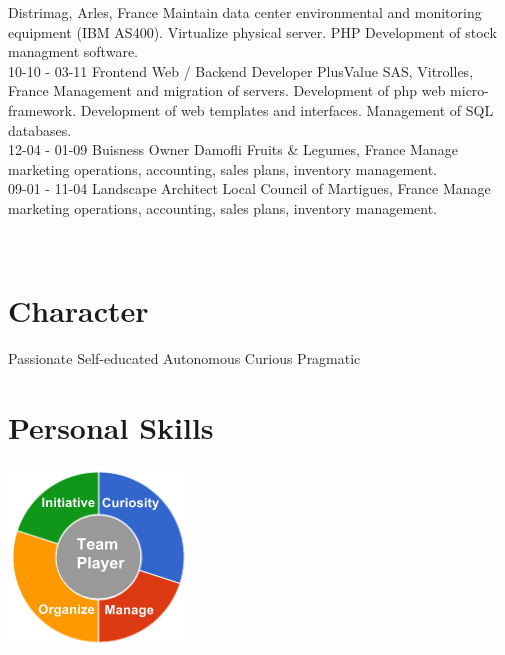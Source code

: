 \documentclass[]{friggeri-cv}
\begin{document}
\begin{entrylist}
        {Distrimag, Arles, France}
        {Maintain data center environmental and monitoring equipment (IBM AS400). Virtualize physical server. PHP Development of stock managment software.\\}
    \entry
        {10-10 - 03-11}
        {Frontend Web / Backend Developer}
        {PlusValue SAS, Vitrolles, France}
        {Management and migration of servers. Development of php web micro-framework. Development of web templates and interfaces. Management of SQL databases.\\}
    \entry
        {12-04 - 01-09}
        {Buisness Owner}
        {Damofli Fruits \& Legumes, France}
        {Manage marketing operations, accounting, sales plans, inventory management.\\}
    \entry
        {09-01 - 11-04}
        {Landscape Architect}
        {Local Council of Martigues, France}
        {Manage marketing operations, accounting, sales plans, inventory management.\\}
\end{entrylist}

\begin{aside}
~
~
~
    \section{Character}
        Passionate
        Self-educated
        Autonomous
        Curious
        Pragmatic
        ~
    \section{Personal Skills}
        \includegraphics[scale=0.62]{img/personal.png}
        ~
\end{aside}

\newpage
\end{document}
